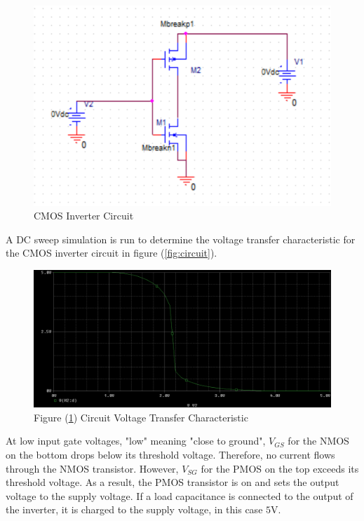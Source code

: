 \FloatBarrier

\begin{figure}[h!]
	\centering
	\includegraphics[scale=0.75]{../images/circuit1.PNG}
	\caption{CMOS Inverter Circuit}
	\label{fig:circuit1}
\end{figure}

\FloatBarrier

A DC sweep simulation is run to determine the voltage transfer characteristic for the CMOS inverter circuit in figure (\ref{fig:circuit}).

\FloatBarrier

\begin{figure}[h!]
	\centering
	\includegraphics[scale=0.75]{../images/circuit1_dcsweep.PNG}
	\caption{Figure (\ref{fig:circuit1}) Circuit Voltage Transfer Characteristic}
	\label{fig:circuit1_dcsweep}
\end{figure}

\FloatBarrier

At low input gate voltages, "low" meaning "close to ground", $V_{GS}$ for the NMOS on the bottom drops below its threshold voltage. Therefore, no current flows through the NMOS transistor. However, $V_{SG}$ for the PMOS on the top exceeds its threshold voltage. As a result, the PMOS transistor is on and sets the output voltage to the supply voltage. If a load capacitance is connected to the output of the inverter, it is charged to the supply voltage, in this case $5$\si{\volt}. \\

